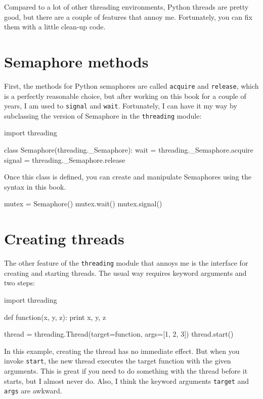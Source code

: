 \documentclass{book}
\begin{document}
Compared to a lot of other threading environments, Python threads are
pretty good, but there are a couple of features that annoy me.
Fortunately, you can fix them with a little clean-up code.

\section{Semaphore methods}

First, the methods for Python semaphores are called {\tt acquire}
and {\tt release}, which is a perfectly reasonable choice, but
after working on this book for a couple of years, I am used
to {\tt signal} and {\tt wait}.  Fortunately, I can have it
my way by subclassing the version of Semaphore in the
    {\tt threading} module:

\begin{unbreakable}[title={Semaphore name change}]{}
import threading
 
class Semaphore(threading._Semaphore):
    wait = threading._Semaphore.acquire
    signal = threading._Semaphore.release
\end{unbreakable}

Once this class is defined, you can create and manipulate Semaphores
using the syntax in this book.

\begin{unbreakable}[title={Semaphore example}]{}
mutex = Semaphore()
mutex.wait()
mutex.signal()
\end{unbreakable}

\section{Creating threads}

The other feature of the {\tt threading} module that annoys
me is the interface for creating and starting threads.  The
usual way requires keyword arguments and two steps:

\begin{unbreakable}[title={Thread example (standard way)}]{}
import threading

def function(x, y, z):
    print x, y, z

thread = threading.Thread(target=function, 
 args=[1, 2, 3])
thread.start()
\end{unbreakable}

In this example, creating the thread has no immediate effect.
But when you invoke {\tt start}, the new thread executes
the target function with the given arguments.
This is great if you need to do something with the thread
before it starts, but I almost never do.
Also, I think the keyword arguments {\tt target} and {\tt args}
are awkward.
\end{document}
